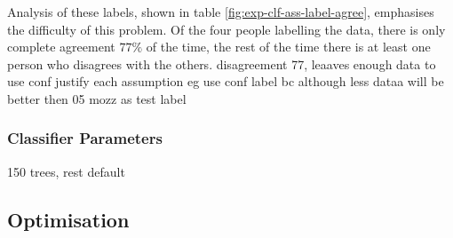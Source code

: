             Analysis of these labels, shown in table \ref{fig:exp-clf-ass-label-agree}, emphasises the difficulty of this problem. Of the four people labelling the data, there is only complete agreement $77\%$ of the time, the rest of the time there is at least one person who disagrees with the others.
        disagreement 77, leaaves enough data to use conf
            justify each assumption eg use conf label bc although less dataa will be better
            then 05 mozz as test label

        \subsubsection{Classifier Parameters}
        \label{subsubsec:exp-clf-ass-param}
            150 trees, rest default
        
    \subsection{Optimisation}
    \label{subsec:exp-clf-opt}

